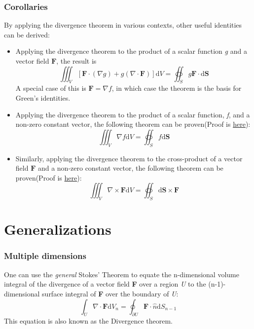 \documentclass[a4paper]{article}
\begin{document}
\section*{Corollaries}
By applying the divergence theorem in various contexts, other useful identities can be derived:
\begin{itemize}
\item Applying the divergence theorem to the product of a scalar function \textit{g} and a vector field $\boldsymbol{F}$, the result is
\begin{equation}
\iiint_V \left[\boldsymbol{F}\cdot\left(\nabla g\right) + g\left(\nabla\cdot\boldsymbol{F}\right)\right]\mathrm{d}V=\oiint_S g\boldsymbol{F}\cdot\mathrm{d}\boldsymbol{S}
\end{equation}
A special case of this is $\mathbf{F}=\nabla f$, in which case the theorem is the basis for Green's identities.
\item Applying the divergence theorem to the product of a scalar function, \textit{f}, and a non-zero constant vector, the following theorem can be proven(Proof is \hyperlink{proof1}{here}):
\begin{equation}
\iiint_V \nabla f \mathrm{d}V=\oiint_S f\mathrm{d}\boldsymbol{S}
\end{equation}
\item Similarly, applying the divergence theorem to the cross-product of a vector field $\mathbf{F}$ and a non-zero constant vector, the following theorem can be proven(Proof is \hyperlink{proof2}{here}):
\begin{equation}
\iiint_V \nabla\times\boldsymbol{F}\mathrm{d}V=\oiint_S \mathrm{d}\boldsymbol{S}\times\boldsymbol{F}
\end{equation}
\end{itemize}
\part{Generalizations}
\section{Multiple dimensions}
One can use the \emph{general} Stokes' Theorem to equate the n-dimensional volume integral of the divergence of a vector field \textbf{F} over a region \textit{U} to the (n-1)-dimensional surface integral of \textbf{F} over the boundary of \textit{U}:
\begin{equation}
\int_U \nabla\cdot\boldsymbol{F}\mathrm{d}V_{n}=\oint_{\partial U} \boldsymbol{F}\cdot\hat{n}\mathrm{d}S_{n-1}
\end{equation}
This equation is also known as the Divergence theorem.
\end{document}
